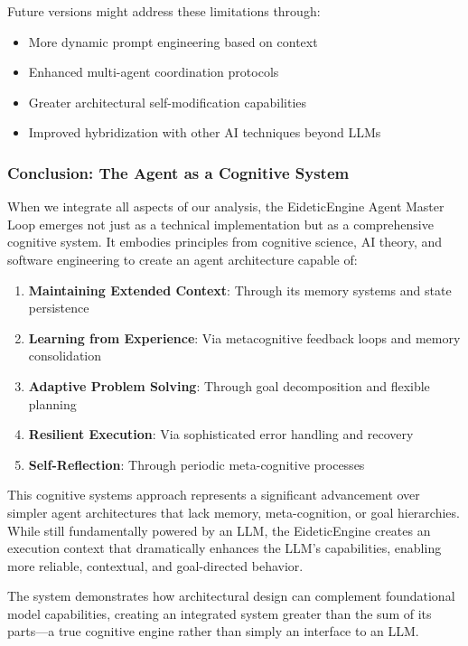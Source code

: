 \documentclass[12pt,a4paper]{article}
\begin{document}
Future versions might address these limitations through:
\begin{itemize}
    \item More dynamic prompt engineering based on context
    \item Enhanced multi-agent coordination protocols
    \item Greater architectural self-modification capabilities
    \item Improved hybridization with other AI techniques beyond LLMs
\end{itemize}

\subsubsection*{Conclusion: The Agent as a Cognitive System}

When we integrate all aspects of our analysis, the EideticEngine Agent Master Loop emerges not just as a technical implementation but as a comprehensive cognitive system. It embodies principles from cognitive science, AI theory, and software engineering to create an agent architecture capable of:

\begin{enumerate}[label=\arabic*.]
    \item \textbf{Maintaining Extended Context}: Through its memory systems and state persistence
    \item \textbf{Learning from Experience}: Via metacognitive feedback loops and memory consolidation
    \item \textbf{Adaptive Problem Solving}: Through goal decomposition and flexible planning
    \item \textbf{Resilient Execution}: Via sophisticated error handling and recovery
    \item \textbf{Self-Reflection}: Through periodic meta-cognitive processes
\end{enumerate}

This cognitive systems approach represents a significant advancement over simpler agent architectures that lack memory, meta-cognition, or goal hierarchies. While still fundamentally powered by an LLM, the EideticEngine creates an execution context that dramatically enhances the LLM's capabilities, enabling more reliable, contextual, and goal-directed behavior.

The system demonstrates how architectural design can complement foundational model capabilities, creating an integrated system greater than the sum of its parts—a true cognitive engine rather than simply an interface to an LLM.
\end{document}

